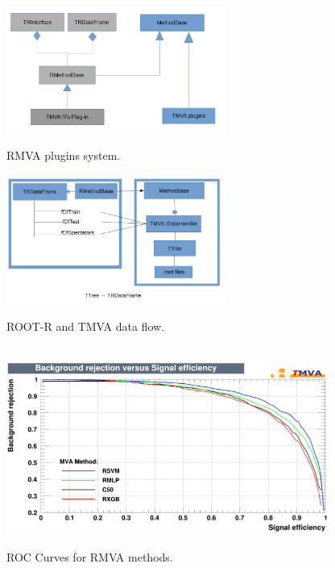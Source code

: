 \documentclass[a4paper]{jpconf}
\begin{document}
\begin{figure}[h]
\centering
\begin{minipage}{15pc}
\includegraphics[width=17pc]{img/rmvaplugins.png}
\caption{\label{rmvaplug}RMVA plugins system.}
\end{minipage}\hspace{2pc}%
\begin{minipage}{15pc}
\includegraphics[width=17pc]{img/rmvadf.jpg}
\caption{\label{rmvadf}ROOT-R and TMVA data flow.}
\end{minipage}\hspace{2pc}%
\vspace{2pc}%
\hspace*{\fill} \\
\includegraphics[width=25pc]{img/rmvaroc.png}\caption{\label{rmvaroc} ROC Curves for RMVA methods.}
\end{figure}
\end{document}
